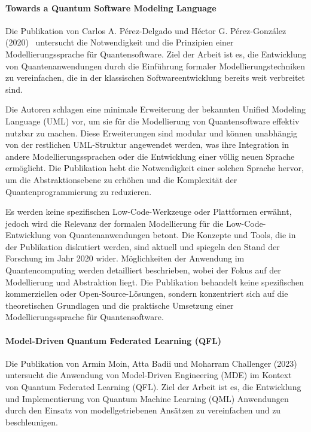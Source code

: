 \paragraph{Towards a Quantum Software Modeling Language}

Die Publikation von Carlos A. Pérez-Delgado und Héctor G. Pérez-González (2020)~\cite{Perez-Delgado_2020} untersucht die Notwendigkeit und die 
Prinzipien einer Modellierungssprache für Quantensoftware. Ziel der Arbeit ist es, die Entwicklung von 
Quantenanwendungen durch die Einführung formaler Modellierungstechniken zu vereinfachen, die in der 
klassischen Softwareentwicklung bereits weit verbreitet sind.

Die Autoren schlagen eine minimale Erweiterung der bekannten Unified Modeling Language (UML) vor, um sie für die 
Modellierung von Quantensoftware effektiv nutzbar zu machen. Diese Erweiterungen sind modular und können unabhängig 
von der restlichen UML-Struktur angewendet werden, was ihre Integration in andere Modellierungssprachen 
oder die Entwicklung einer völlig neuen Sprache ermöglicht. Die Publikation hebt die Notwendigkeit einer solchen Sprache 
hervor, um die Abstraktionsebene zu erhöhen und die Komplexität der Quantenprogrammierung zu reduzieren.

Es werden keine spezifischen Low-Code-Werkzeuge oder Plattformen erwähnt, jedoch wird die Relevanz der 
formalen Modellierung für die Low-Code-Entwicklung von Quantenanwendungen betont. 
Die Konzepte und Tools, die in der Publikation diskutiert werden, sind aktuell und spiegeln den Stand der Forschung im Jahr 2020 wider. 
Möglichkeiten der Anwendung im Quantencomputing werden detailliert beschrieben, wobei der Fokus auf der Modellierung 
und Abstraktion liegt. Die Publikation behandelt keine spezifischen kommerziellen oder Open-Source-Lösungen, sondern 
konzentriert sich auf die theoretischen Grundlagen und die praktische Umsetzung einer Modellierungssprache für Quantensoftware.

\paragraph{Model-Driven Quantum Federated Learning (QFL)}

Die Publikation von Armin Moin, Atta Badii und Moharram Challenger (2023)~\cite{Moin_2023} untersucht die Anwendung von 
Model-Driven Engineering (MDE) im Kontext von Quantum Federated Learning (QFL). Ziel der Arbeit ist es, die Entwicklung und 
Implementierung von Quantum Machine Learning (QML) Anwendungen durch den Einsatz von modellgetriebenen Ansätzen zu vereinfachen und zu beschleunigen.

